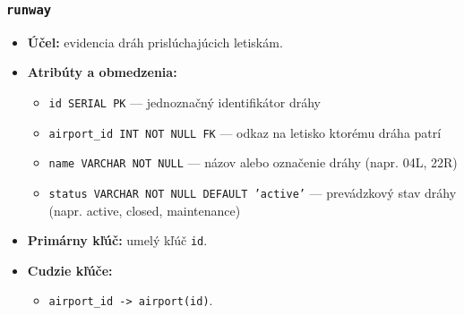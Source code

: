 \documentclass[11pt, a4paper]{article}
\begin{document}
\subsubsection*{\texttt{runway}}
\begin{itemize}
    \item \textbf{Účel:} evidencia dráh prislúchajúcich letiskám.
    \item \textbf{Atribúty a obmedzenia:}
    \begin{itemize}
        \item \texttt{id SERIAL PK} --- jednoznačný identifikátor dráhy
        \item \texttt{airport\_id INT NOT NULL FK} --- odkaz na letisko ktorému dráha patrí
        \item \texttt{name VARCHAR NOT NULL} --- názov alebo označenie dráhy (napr. 04L, 22R)
        \item \texttt{status VARCHAR NOT NULL DEFAULT 'active'} --- prevádzkový stav dráhy (napr. active, closed, maintenance)
    \end{itemize}
    \item \textbf{Primárny kľúč:} umelý kľúč \texttt{id}.
    \item \textbf{Cudzie kľúče:} 
        \begin{itemize}
            \item \texttt{airport\_id -> airport(id)}.
        \end{itemize}
\end{itemize}
\end{document}
